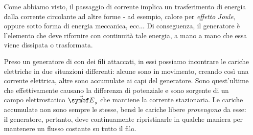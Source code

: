 Come abbiamo visto, il passaggio di corrente implica un trasferimento di energia dalla corrente circolante ad altre forme - ad esempio, calore per \textit{effetto Joule}, oppure sotto forma di energia meccanica, ecc... Di conseguenza, il generatore è l'elemento che deve rifornire con continuità tale energia, a mano a mano che essa viene dissipata o trasformata.

Preso un generatore di \fem con dei fili attaccati, in essi possiamo incontrare le cariche elettriche in due situazioni differenti: alcune sono in movimento, creando così una corrente elettrica, altre sono accumulate ai capi del generatore. Sono quest'ultime che effettivamente causano la differenza di potenziale e sono sorgente di un campo elettrostatico $\vba{E}_s$ che mantiene la corrente stazionaria. Le cariche accumulate non sono sempre le stesse, bensì le cariche libere \textit{provengono} da esse: il generatore, pertanto, deve continuamente ripristinarle in qualche maniera per mantenere un flusso costante su tutto il filo.

